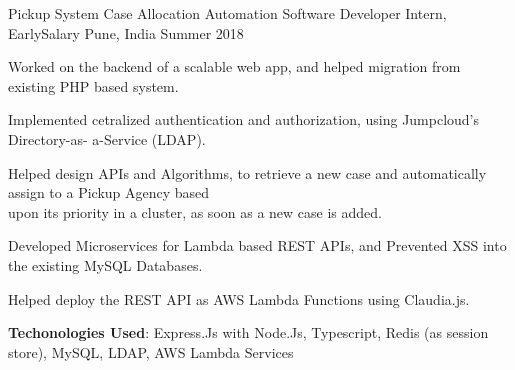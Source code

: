\begin{cventries}

  \cventry
  {Pickup System Case Allocation Automation}
  {Software Developer Intern, EarlySalary}
  {Pune, India}
  {Summer 2018}
  {
    \begin{cvitems}
	\item Worked on the backend of a scalable web app, and helped migration from existing PHP based system.
	\item Implemented cetralized authentication and authorization, using Jumpcloud’s Directory-as-
a-Service (LDAP).
\item Helped design APIs and Algorithms, to retrieve a new case and automatically assign to a Pickup Agency based \\ upon its priority in a cluster, as soon as a new case is added.
\item Developed Microservices for Lambda based REST APIs, and Prevented XSS into the existing MySQL Databases.
\item Helped deploy the REST API as AWS Lambda Functions using Claudia.js.
\item \textbf{Techonologies Used}: Express.Js with Node.Js, Typescript, Redis (as session store), MySQL,
LDAP, AWS Lambda Services
    \end{cvitems}
  }

\end{cventries}
